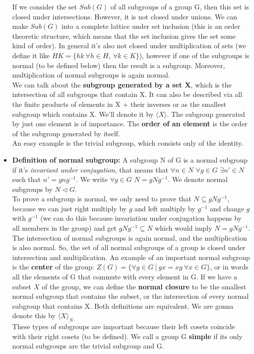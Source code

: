 \documentclass[a4paper]{article}
\begin{document}
\begin{itemize}
If we consider the set $Sub(G)$ of all subgroups of a group G, then this set is closed under intersections. However, it is not closed under unions. We can make $Sub(G)$ into a complete lattice under set inclusion (this is an order theoretic structure, which means that the set inclusion gives the set some kind of order). In general it's also not closed under multiplication of sets (we define it like $HK= \{hk\ \forall h \in H,\ \forall k \in K \}$), however if one of the subgroups is normal (to be defined below) then the result is a subgroup. Moreover, multiplication of normal subgroups is again normal.\\
We can talk about the \textbf{subgroup generated by a set X}, which is the intersection of all subgroups that contain X. It can also be described via all the finite products of elements in X + their inverses or as the smallest subgroup which contains X. We'll denote it by $\langle X \rangle$. The subgroup generated by just one element is of importance. The \textbf{order of an element} is the order of the subgroup generated by itself.\\
An easy example is the trivial subgroup, which consists only of the identity.

\item
\textbf{Definition of normal subgroup: }A subgroup N of G is a normal subgroup if it's \textit{invariant under conjugation}, that means that $\forall n \in N$ $\forall g \in G$ $\exists n' \in N$ such that $n'=gng^{-1}$. We write $\forall g \in G$ $N=gNg^{-1}$. We denote normal subgroups by $N \triangleleft G$.\\
To prove a subgroup is normal, we only need to prove that $N\subseteq gNg^{-1}$, because we can just right multiply by $g$ and left multiply by $g^{-1}$ and change $g$ with $g^{-1}$ (we can do this because invariation under conjugation happens by all members in the group) and get $gNg^{-1}\subseteq N$ which would imply $N=gNg^{-1}$. The intersection of normal subgroups is again normal, and the multiplication is also normal. So, the set of all normal subgroups of a group is closed under intersection and multiplication. An example of an important normal subgroup is the \textbf{center} of the group: $Z(G) = \{\forall g \in G\ |\ gx=xg\ \forall x \in G\}$, or in words all the elements of G that commute with every element in G. If we have a subset $X$ of the group, we can define the \textbf{normal closure} to be the smallest normal subgroup that contains the subset, or the intersection of every normal subgroup that contains X. Both definitions are equivalent. We are gonna denote this by $\langle X \rangle_{N}$\\
These types of subgroups are important because their left cosets coincide with their right cosets (to be defined). We call a group G \textbf{simple} if its only normal subgroups are the trivial subgroup and G.


\end{itemize}
\end{document}
